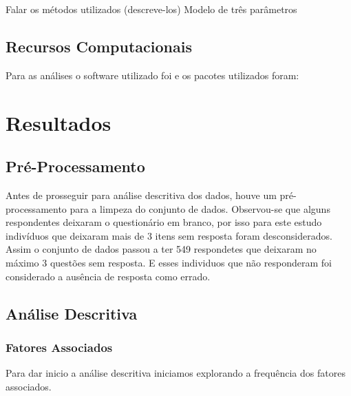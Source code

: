 \documentclass[]{article}
\begin{document}
Falar os métodos utilizados (descreve-los) Modelo de três parâmetros

\subsection{Recursos Computacionais}\label{recursos-computacionais}

Para as análises o software utilizado foi \citet{software-r} e os
pacotes utilizados foram:

\section{Resultados}\label{resultados}

\subsection{Pré-Processamento}\label{pre-processamento}

Antes de prosseguir para análise descritiva dos dados, houve um
pré-processamento para a limpeza do conjunto de dados. Observou-se que
alguns respondentes deixaram o questionário em branco, por isso para
este estudo indivíduos que deixaram mais de 3 itens sem resposta foram
desconsiderados. Assim o conjunto de dados passou a ter 549 respondetes
que deixaram no máximo 3 questões sem resposta. E esses individuos que
não responderam foi considerado a ausência de resposta como errado.

\subsection{Análise Descritiva}\label{analise-descritiva}

\subsubsection{Fatores Associados}\label{fatores-associados}

Para dar inicio a análise descritiva iniciamos explorando a frequência
dos fatores associados.
\end{document}
